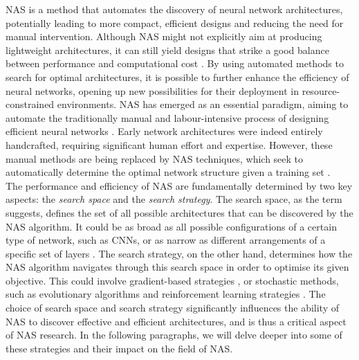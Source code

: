\acf{NAS} is a method that automates the discovery of neural network
architectures, potentially leading to more compact, efficient designs and
reducing the need for manual intervention. Although \ac{NAS} might not
explicitly aim at producing lightweight architectures, it can still yield
designs that strike a good balance between performance and computational cost
\cite{DBLP:conf/cvpr/TanCPVSHL19,DBLP:conf/icml/TanL19}. By using automated
methods to search for optimal architectures, it is possible to further enhance
the efficiency of neural networks, opening up new possibilities for their
deployment in resource-constrained environments. \ac{NAS} has emerged as an
essential paradigm, aiming to automate the traditionally manual and
labour-intensive process of designing efficient neural networks
\cite{DBLP:journals/corr/MiikkulainenLMR17}. Early network architectures were
indeed entirely handcrafted, requiring significant human effort and expertise.
However, these manual methods are being replaced by \ac{NAS} techniques, which
seek to automatically determine the optimal network structure given a training
set \cite{DBLP:journals/corr/abs-2301-08727,elsken2019neural}.\\

The performance and efficiency of \ac{NAS} are fundamentally determined by two
key aspects: the \emph{search space} and the \emph{search strategy}. The search
space, as the term suggests, defines the set of all possible architectures that
can be discovered by the \ac{NAS} algorithm. It could be as broad as all
possible configurations of a certain type of network, such as \acp{CNN}, or as
narrow as different arrangements of a specific set of layers
\cite{DBLP:conf/cvpr/LiuCSAHY019}. The search strategy, on the other hand,
determines how the \ac{NAS} algorithm navigates through this search space in
order to optimise its given objective. This could involve gradient-based
strategies \cite{DBLP:conf/iclr/LiuSY19,DBLP:conf/iclr/XuX0CQ0X20}, or
stochastic methods, such as evolutionary algorithms and reinforcement learning
strategies \cite{DBLP:conf/iclr/ZophL17,DBLP:conf/icml/RealMSSSTLK17}. The
choice of search space and search strategy significantly influences the ability
of \ac{NAS} to discover effective and efficient architectures, and is thus a
critical aspect of NAS research. In the following paragraphs, we will delve
deeper into some of these strategies and their impact on the field of
\ac{NAS}.\\



